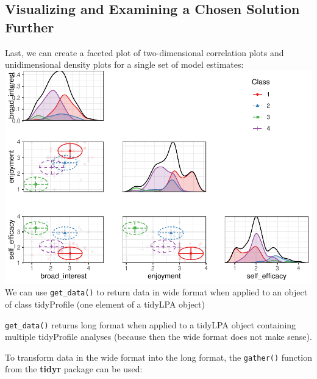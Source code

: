 \documentclass[man]{apa6}
\newenvironment{Shaded}{\begin{snugshade}}{\end{snugshade}}
\newcommand{\DecValTok}[1]{\textcolor[rgb]{0.00,0.00,0.81}{#1}}
\newcommand{\KeywordTok}[1]{\textcolor[rgb]{0.13,0.29,0.53}{\textbf{#1}}}
\newcommand{\NormalTok}[1]{#1}
\newcommand{\OperatorTok}[1]{\textcolor[rgb]{0.81,0.36,0.00}{\textbf{#1}}}
\newcommand{\StringTok}[1]{\textcolor[rgb]{0.31,0.60,0.02}{#1}}
\begin{document}
\hypertarget{visualizing-and-examining-a-chosen-solution-further}{%
\subsection{Visualizing and Examining a Chosen Solution Further}\label{visualizing-and-examining-a-chosen-solution-further}}

Last, we can create a faceted plot of two-dimensional correlation plots and unidimensional density plots for a single set of model estimates:
\includegraphics{paper_files/figure-latex/unnamed-chunk-11-1.pdf}
We can use \texttt{get\_data()} to return data in wide format when applied to an object
of class tidyProfile (one element of a tidyLPA object)

\texttt{get\_data()} returns long format when applied to a
tidyLPA object containing multiple tidyProfile analyses (because then the wide
format does not make sense).

To transform data in the wide format into the long format, the \texttt{gather()}
function from the \textbf{tidyr} package can be used:

\begin{Shaded}
\end{Shaded}
\end{document}
